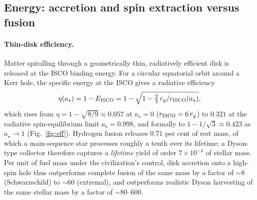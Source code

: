 \documentclass[11pt]{article}
\newcommand{\astar}{a_\star}
\begin{document}
\subsection{Energy: accretion and spin extraction versus fusion}
\paragraph{Thin-disk efficiency.} Matter spiralling through a geometrically thin, radiatively efficient disk is released at the ISCO binding energy. For a circular equatorial orbit around a Kerr hole, the specific energy at the ISCO gives a radiative efficiency \citep{bardeen1972,novikov1973}
\begin{equation}
\eta(\astar) = 1 - E_{\rm ISCO} = 1 - \sqrt{1 - \tfrac{2}{3}\,r_g/r_{\rm ISCO}(\astar)},
\end{equation}
which rises from $\eta = 1-\sqrt{8/9} \approx 0.057$ at $\astar = 0$ ($r_{\rm ISCO} = 6\,r_g$) to $0.321$ at the \citet{thorne1974} radiative spin-equilibrium limit $\astar = 0.998$, and formally to $1 - 1/\sqrt{3} \approx 0.423$ as $\astar \to 1$ (Fig.~\ref{fig:eff}). Hydrogen fusion releases $0.71$ per cent of rest mass, of which a main-sequence star processes roughly a tenth over its lifetime; a Dyson-type collector \citep{dyson1960} therefore captures a \emph{lifetime} yield of order $7\times10^{-4}$ of stellar mass. Per unit of fuel mass under the civilization's control, disk accretion onto a high-spin hole thus outperforms complete fusion of the same mass by a factor of ${\sim}8$ (Schwarzschild) to ${\sim}60$ (extremal), and outperforms realistic Dyson harvesting of the same stellar mass by a factor of ${\sim}80$--$600$.
\end{document}
